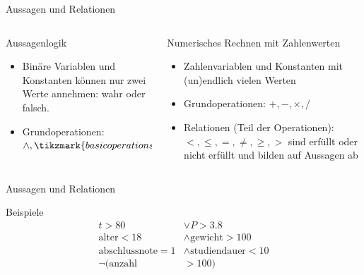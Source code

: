 \documentclass[xelatex,aspectratio=169]{beamer}
\begin{document}
\begin{frame}{Aussagen und Relationen}
  \begin{columns}[T]
    \begin{column}{0.5\textwidth}
      \begin{block}{Aussagenlogik}
        \begin{itemize}
          \item Binäre Variablen und Konstanten können nur zwei Werte annehmen: wahr oder falsch.
          \item Grundoperationen: \( \land, \tikzmark{basicoperations}\lor, \lnot \)
        \end{itemize}
      \end{block}
    \end{column}
    \begin{column}{0.5\textwidth}
      \begin{block}{Numerisches Rechnen mit Zahlenwerten}
        \begin{itemize}
          \item Zahlenvariablen und Konstanten mit (un)endlich vielen Werten
          \item Grundoperationen: \( +, -, \times, / \)
          \item Relationen (Teil der Operationen): \( <, \leq, =, \neq, \geq, > \) sind erfüllt oder nicht erfüllt und bilden auf Aussagen ab
        \end{itemize}
      \end{block}
    \end{column}
  \end{columns}
\end{frame}

\begin{frame}{Aussagen und Relationen}
  \begin{exampleblock}{Beispiele}
    \vspace{-\baselineskip}
    \begin{align*}
      t > 80                   & \lor P > 3.8                   \\
      \mbox{alter} < 18        & \land \mbox{gewicht} > 100     \\
      \mbox{abschlussnote} = 1 & \land \mbox{studiendauer} < 10 \\
      \lnot (\mbox{anzahl}     & > 100)
    \end{align*}
  \end{exampleblock}
\end{frame}
\end{document}
